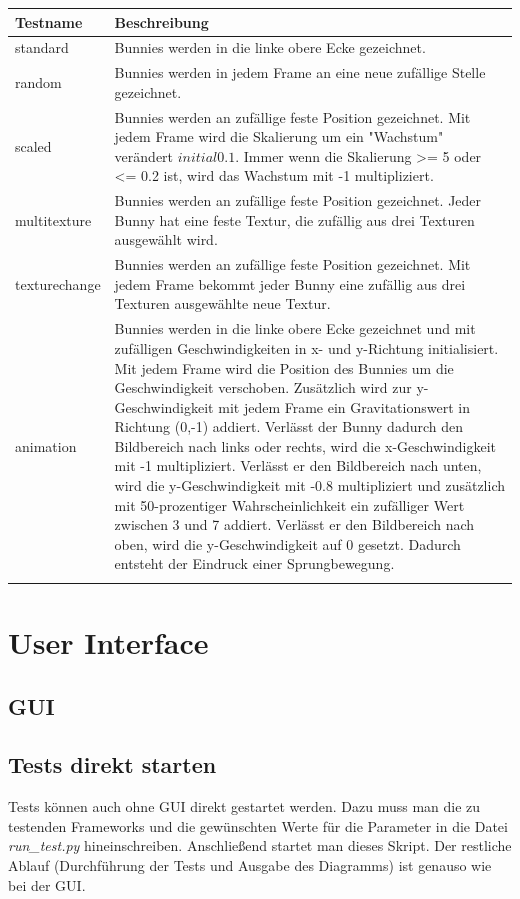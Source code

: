 \begin{center}
    \begin{tabular}{ | l | p{12cm} |}
    \hline
    Testname & Beschreibung \\ \hline
    standard & Bunnies werden in die linke obere Ecke gezeichnet.\\ \hline
    random & Bunnies werden in jedem Frame an eine neue zufällige Stelle gezeichnet.\\ \hline
    scaled & Bunnies werden an zufällige feste Position gezeichnet. Mit jedem Frame wird die Skalierung um ein "Wachstum" verändert \(initial 0.1\). Immer wenn die Skalierung >= 5 oder <= 0.2 ist, wird das Wachstum mit -1 multipliziert. \\ \hline
    multitexture & Bunnies werden an zufällige feste Position gezeichnet. Jeder Bunny hat eine feste Textur, die zufällig aus drei Texturen ausgewählt wird.\\ \hline
    texturechange & Bunnies werden an zufällige feste Position gezeichnet. Mit jedem Frame bekommt jeder Bunny eine zufällig aus drei Texturen ausgewählte neue Textur. \\ \hline
    animation & Bunnies werden in die linke obere Ecke gezeichnet und mit zufälligen Geschwindigkeiten in x- und y-Richtung initialisiert. Mit jedem Frame wird die Position des Bunnies um die Geschwindigkeit verschoben. Zusätzlich wird zur y-Geschwindigkeit mit jedem Frame ein Gravitationswert in Richtung (0,-1) addiert. Verlässt der Bunny dadurch den Bildbereich nach links oder rechts, wird die x-Geschwindigkeit mit -1 multipliziert. Verlässt er den Bildbereich nach unten, wird die y-Geschwindigkeit mit -0.8 multipliziert und zusätzlich mit 50-prozentiger Wahrscheinlichkeit ein zufälliger Wert zwischen 3 und 7 addiert. Verlässt er den Bildbereich nach oben, wird die y-Geschwindigkeit auf 0 gesetzt. Dadurch entsteht der Eindruck einer Sprungbewegung.\\ \hline
    \\ \hline
    \end{tabular}
\end{center}

\section{User Interface}
\subsection{GUI}
\subsection{Tests direkt starten}
Tests können auch ohne GUI direkt gestartet werden. Dazu muss man die zu testenden Frameworks und die gewünschten Werte für die Parameter in die Datei \textit{run\_test.py} hineinschreiben. Anschließend startet man dieses Skript. Der restliche Ablauf (Durchführung der Tests und Ausgabe des Diagramms) ist genauso wie bei der GUI.

